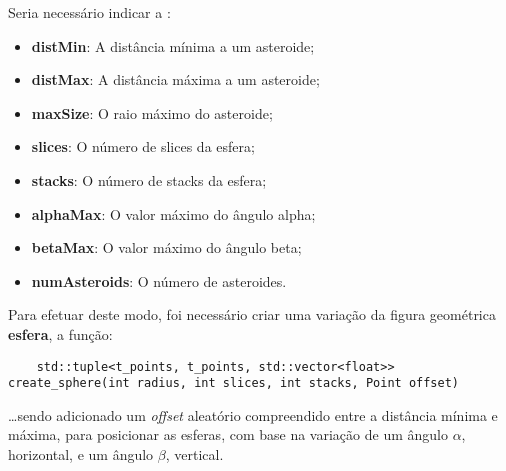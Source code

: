 \documentclass[relatorio.tex]{subfiles}
\begin{document}
Seria necessário indicar a :
\begin{itemize}
    \item \textbf{distMin}: A distância mínima a um asteroide;
    \item \textbf{distMax}: A distância máxima a um asteroide;
    \item \textbf{maxSize}: O raio máximo do asteroide;
    \item \textbf{slices}: O número de slices da esfera;
    \item \textbf{stacks}: O número de stacks da esfera;
    \item \textbf{alphaMax}: O valor máximo do ângulo alpha;
    \item \textbf{betaMax}: O valor máximo do ângulo beta;
    \item \textbf{numAsteroids}: O número de asteroides.
\end{itemize}

Para efetuar deste modo, foi necessário criar uma variação 
da figura geométrica \textbf{esfera}, a função:

\begin{verbatim}
    std::tuple<t_points, t_points, std::vector<float>> create_sphere(int radius, int slices, int stacks, Point offset)
\end{verbatim}
\dots sendo adicionado um \textit{offset} aleatório compreendido
entre a distância mínima e máxima, para posicionar as esferas,
com base na variação de um ângulo $\alpha$, horizontal,
e um ângulo $\beta$, vertical.
\end{document}
